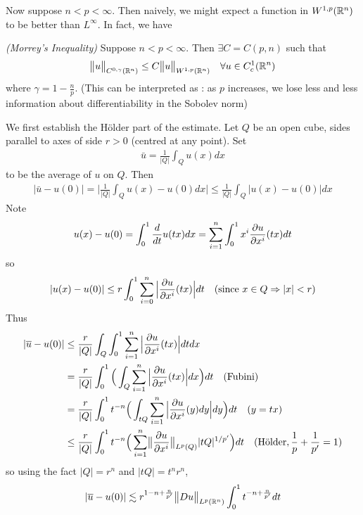 \documentclass[10pt,a4paper]{report}
\newenvironment{proof}
{\begin{changemargin}{1cm}{0.5cm} 
	}%
	{\end{changemargin}
}
\begin{document}
Now suppose $n<p< \infty$. Then naively, we might expect a function in $W^{1,p}(\mathbb{R}^n)$ to be better than $L^{\infty}$. In fact, we have
\s

\thm \emph{(Morrey's Inequality)} Suppose $n<p<\infty$. Then $\exists C = C(p,n)$ such that
\begin{align*}
\bigl\lVert u\bigr\rVert_{C^{0,\gamma}(\mathbb{R}^n)} \leq C\bigl\lVert u\bigr\rVert_{W^{1,p}(\mathbb{R}^n)} \quad \forall u \in C_c^1(\mathbb{R}^n)
\end{align*}
where $\gamma = 1-\frac{n}{p}$. (This can be interpreted as : as $p$ increases, we lose less and less information about differentiability in the Sobolev norm)
\begin{proof}
\pf We first establish the H\"{o}lder part of the estimate. Let $Q$ be an open cube, sides parallel to axes of side $r>0$ (centred at any point). Set
\begin{align*}
\bar{u} = \frac{1}{|Q|} \int_{Q} u(x) dx
\end{align*}
to be the average of $u$ on $Q$. Then
\begin{align*}
|\bar{u}-u(0)| = \Big| \frac{1}{|Q|} \int_{Q} u(x) -u(0) dx \Big| \leq \frac{1}{|Q|} \int_{Q} |u(x)-u(0)| dx
\end{align*}
Note
\begin{align*}
u(x) - u(0) = \int_0^1 \frac{d}{dt} u(tx)dx = \sum_{i=1}^n \int_0^1 x^i \frac{\partial u}{\partial x^i} (tx) dt
\end{align*}
so
\begin{align*}
|u(x) - u(0)| \leq r \int_0^1 \sum_{i=0}^n \Big| \frac{\partial u}{\partial x^i} (tx)\Big| dt \quad \text{(since }x\in Q \Rightarrow |x|<r)
\end{align*}
Thus
\begin{align*}
|\overline{u}-u(0)| &\leq \frac{r}{|Q|} \int_Q \int_0^1 \sum_{i=1}^n \Big| \frac{\partial u}{\partial x^i}(tx)\Big| dtdx  \\
&=\frac{r}{|Q|} \int_0^1 \Big( \int_Q \sum_{i=1}^n \Big| \frac{\partial u}{\partial x^i} (tx) \Big| dx \Big) dt \quad (\text{Fubini}) \\
&= \frac{r}{|Q|} \int_0^1 t^{-n} \Big( \int_{tQ} \sum_{i=1}^n \Big| \frac{\partial u}{\partial x^i} (y) dy \Big| dy \Big) dt \quad (y=tx) \\
&\leq \frac{r}{|Q|} \int_0^1 t^{-n} \Big( \sum_{i=1}^n \bigl\lVert\frac{\partial u}{\partial x^i}\bigr\rVert_{L^p(Q)} |tQ|^{1/p'} \Big) dt \quad (\text{H\"{o}lder}, \frac{1}{p}+ \frac{1}{p'} = 1)
\end{align*}
so using the fact $|Q| = r^n$ and $|tQ| = t^n r^n$,
\begin{align*}
|\bar{u}-u(0)| &\lesssim r^{1-n+ \frac{n}{p'}} \norms{Du}{L^p(\reals^n)} \int_0^1 t^{-n + \frac{n}{p'}} dt \\

\end{align*}
\end{proof}
\end{document}
